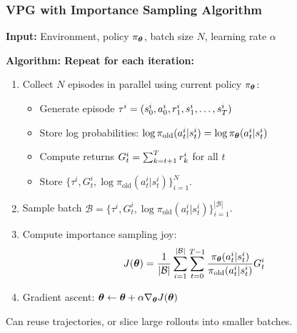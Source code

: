 \begin{frame}
\frametitle{VPG with Importance Sampling Algorithm}
\textbf{Input:} Environment, policy $\pi_{{\boldsymbol{\theta}}}$, batch size $N$, learning rate $\alpha$

\textbf{Algorithm: Repeat for each iteration:}
\begin{enumerate}
   
	\item Collect $N$ episodes in parallel using current policy $\pi_{{\boldsymbol{\theta}}}$:
	\begin{itemize}
		\item Generate episode $\tau^i = (s_0^i, a_0^i, r_1^i, s_1^i, \ldots, s_T^i)$
		\item Store log probabilities: $\log \pi_{\text{old}}(a_t^i | s_t^i) = \log \pi_{{\boldsymbol{\theta}}}(a_t^i | s_t^i)$
		\item Compute returns $G_t^i = \sum_{k=t+1}^T r_k^i$ for all $t$
		\item Store $\{\tau^i, G_t^i, \log \pi_{\text{old}}(a_t^i | s_t^i)\}_{i=1}^{N}$.
	\end{itemize}
	\item Sample batch $\mathcal{B} = \{\tau^i, G_t^i, \log \pi_{\text{old}}(a_t^i | s_t^i)\}_{i=1}^{|\mathcal{B}|}$.
	\item Compute importance sampling joy:
	$$
		J({\boldsymbol{\theta}}) = \frac{1}{|\mathcal{B}|} \sum_{i=1}^{|\mathcal{B}|} \sum_{t=0}^{T-1} 
		\frac{\pi_{\boldsymbol{\theta}}(a_t^i | s_t^i)}{\pi_{\text{old}}(a_t^i | s_t^i)} G_t^i
		$$
	\item Gradient ascent: ${\boldsymbol{\theta}} \leftarrow {\boldsymbol{\theta}} + \alpha \nabla_{\boldsymbol{\theta}} J({\boldsymbol{\theta}})$
\end{enumerate}

\vspace{0.2cm}
Can reuse trajectories, or slice large rollouts into smaller batches.
\end{frame}




